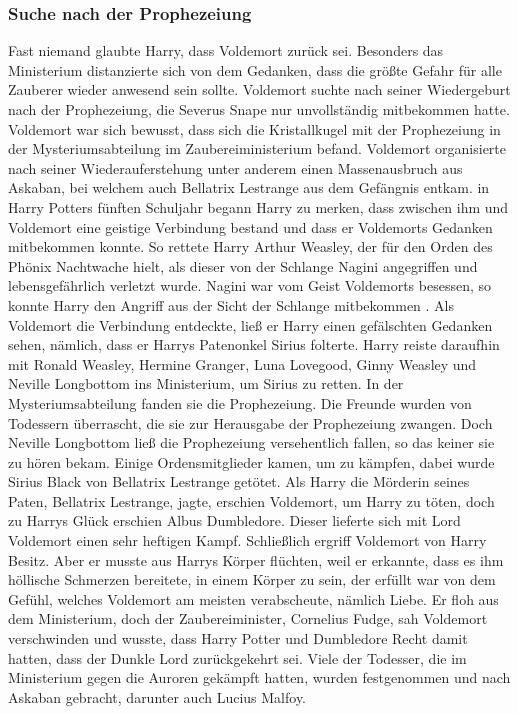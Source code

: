 \documentclass[a4paper, 10pt]{article}
\begin{document}
\subsubsection*{\large Suche nach der Prophezeiung}
Fast niemand glaubte Harry, dass Voldemort zurück sei. Besonders das Ministerium distanzierte sich von dem Gedanken, dass die größte Gefahr für alle Zauberer wieder anwesend sein sollte. Voldemort suchte nach seiner Wiedergeburt nach der Prophezeiung, die Severus Snape nur unvollständig mitbekommen hatte. Voldemort war sich bewusst, dass sich die Kristallkugel mit der Prophezeiung in der Mysteriumsabteilung im Zaubereiministerium befand.
\vspace{10pt}
\newline
Voldemort organisierte nach seiner Wiederauferstehung unter anderem einen Massenausbruch aus Askaban, bei welchem auch Bellatrix Lestrange aus dem Gefängnis entkam.
\vspace{10pt}
\newline
in Harry Potters fünften Schuljahr begann Harry zu merken, dass zwischen ihm und Voldemort eine geistige Verbindung bestand und dass er Voldemorts Gedanken mitbekommen konnte. So rettete Harry Arthur Weasley, der für den Orden des Phönix Nachtwache hielt, als dieser von der Schlange Nagini angegriffen und lebensgefährlich verletzt wurde. Nagini war vom Geist Voldemorts besessen, so konnte Harry den Angriff aus der Sicht der Schlange mitbekommen . Als Voldemort die Verbindung entdeckte, ließ er Harry einen gefälschten Gedanken sehen, nämlich, dass er Harrys Patenonkel Sirius folterte. Harry reiste daraufhin mit Ronald Weasley, Hermine Granger, Luna Lovegood, Ginny Weasley und Neville Longbottom ins Ministerium, um Sirius zu retten. In der Mysteriumsabteilung fanden sie die Prophezeiung. Die Freunde wurden von Todessern überrascht, die sie zur Herausgabe der Prophezeiung zwangen. Doch Neville Longbottom ließ die Prophezeiung versehentlich fallen, so das keiner sie zu hören bekam.
\vspace{10pt}
\newline
Einige Ordensmitglieder kamen, um zu kämpfen, dabei wurde Sirius Black von Bellatrix Lestrange getötet. Als Harry die Mörderin seines Paten, Bellatrix Lestrange, jagte, erschien Voldemort, um Harry zu töten, doch zu Harrys Glück erschien Albus Dumbledore. Dieser lieferte sich mit Lord Voldemort einen sehr heftigen Kampf. Schließlich ergriff Voldemort von Harry Besitz. Aber er musste aus Harrys Körper flüchten, weil er erkannte, dass es ihm höllische Schmerzen bereitete, in einem Körper zu sein, der erfüllt war von dem Gefühl, welches Voldemort am meisten verabscheute, nämlich Liebe. Er floh aus dem Ministerium, doch der Zaubereiminister, Cornelius Fudge, sah Voldemort verschwinden und wusste, dass Harry Potter und Dumbledore Recht damit hatten, dass der Dunkle Lord zurückgekehrt sei.
\vspace{10pt}
\newline
Viele der Todesser, die im Ministerium gegen die Auroren gekämpft hatten, wurden festgenommen und nach Askaban gebracht, darunter auch Lucius Malfoy.
\end{document}
